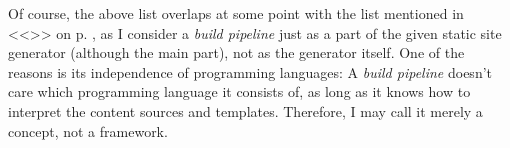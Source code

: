 Of course, the above list overlaps at some point with the list mentioned in <<\emph{}>> on p. \pageref{par:creatingcontent}, as I consider a \emph{build pipeline} just as a part of the given static site generator (although the main part), not as the generator itself. One of the reasons is its independence of programming languages: A \emph{build pipeline} doesn't care which programming language it consists of, as long as it knows how to interpret the content sources and templates. Therefore, I may call it merely a concept, not a framework.




\vspace{20pt}



\vspace{20pt}


